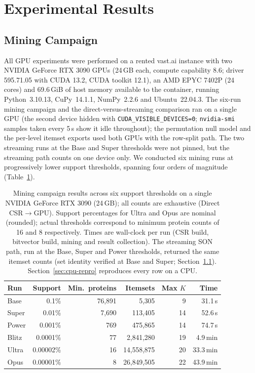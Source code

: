\documentclass[10pt,a4paper,twocolumn]{article}
\begin{document}
\section{Experimental Results}
\label{sec:results}

\subsection{Mining Campaign}
\label{sec:campaign}

All GPU experiments were performed on a rented vast.ai instance with two NVIDIA GeForce RTX 3090 GPUs (24\,GB each, compute capability 8.6; driver 595.71.05 with CUDA 13.2, CUDA toolkit 12.1), an AMD EPYC 7402P (24 cores) and 69.6\,GiB of host memory available to the container, running Python~3.10.13, CuPy~14.1.1, NumPy~2.2.6 and Ubuntu~22.04.3. The six-run mining campaign and the direct-versus-streaming comparison ran on a single GPU (the second device hidden with \texttt{CUDA\_VISIBLE\_DEVICES=0}; \texttt{nvidia-smi} samples taken every 5\,s show it idle throughout); the permutation null model and the per-level itemset exports used both GPUs with the row-split path. The two streaming runs at the Base and Super thresholds were not pinned, but the streaming path counts on one device only. We conducted six mining runs at progressively lower support thresholds, spanning four orders of magnitude (Table~\ref{tab:campaign}).

\begin{table}[t]
\caption{Mining campaign results across six support thresholds on a single NVIDIA GeForce RTX 3090 (24\,GB); all counts are exhaustive (Direct CSR$\to$GPU). Support percentages for Ultra and Opus are nominal (rounded); actual thresholds correspond to minimum protein counts of 16 and 8 respectively. Times are wall-clock per run (CSR build, bitvector build, mining and result collection). The streaming SON path, run at the Base, Super and Power thresholds, returned the same itemset counts (set identity verified at Base and Super; Section~\ref{sec:campaign}). Section~\ref{sec:cpu-repro} reproduces every row on a CPU.}
\label{tab:campaign}
\centering
\small
\begin{tabular}{lrrrrr}
\toprule
Run & Support & Min.\ proteins & Itemsets & Max $K$ & Time \\
\midrule
Base & 0.1\% & 76,891 & 5,305 & 9 & 31.1\,s \\
Super & 0.01\% & 7,690 & 113,405 & 14 & 52.6\,s \\
Power & 0.001\% & 769 & 475,865 & 14 & 74.7\,s \\
Blitz & 0.0001\% & 77 & 2,841,280 & 19 & 4.9\,min \\
Ultra & 0.00002\% & 16 & 14,558,875 & 20 & 33.3\,min \\
Opus & 0.00001\% & 8 & 26,849,505 & 22 & 43.9\,min \\
\bottomrule
\end{tabular}
\end{table}
\end{document}

